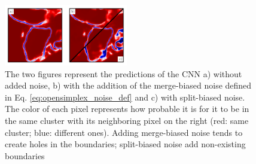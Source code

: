 % 
\begin{figure}
\centering

        \includegraphics[width=0.48\textwidth,trim=0.1in 0.0in 0.05in 0.0in,clip]{figs/noisy_affs_comparison.png}
   
    \caption{The two figures represent the predictions of the CNN a) without added noise, b) with the addition of the merge-biased noise defined in Eq. \ref{eq:opensimplex_noise_def} and c) with split-biased noise. The color of each pixel represents how probable it is for it to be in the same cluster with its neighboring pixel on the right (red: same cluster; blue: different ones). Adding merge-biased noise tends to create holes in the boundaries; split-biased noise add non-existing boundaries }
\end{figure}%

